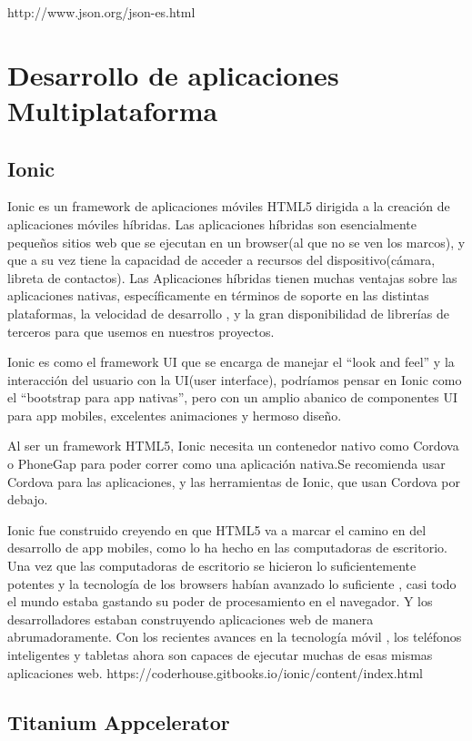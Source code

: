http://www.json.org/json-es.html


\section{Desarrollo de aplicaciones Multiplataforma}

\subsection{Ionic}
\setlength{\parskip}{5mm}
Ionic es un framework de aplicaciones móviles HTML5 dirigida a la creación de aplicaciones móviles híbridas. Las aplicaciones híbridas son esencialmente pequeños sitios web que se ejecutan en un browser(al que no se ven los marcos), y que a su vez tiene la capacidad de acceder a recursos del dispositivo(cámara, libreta de contactos). Las Aplicaciones híbridas tienen muchas ventajas sobre las aplicaciones nativas, específicamente en términos de soporte en las distintas plataformas, la velocidad de desarrollo , y la gran disponibilidad de librerías de terceros para que usemos en nuestros proyectos.

Ionic es como el framework UI que se encarga de manejar el “look and feel” y la interacción del usuario con la UI(user interface), podríamos pensar en Ionic como el “bootstrap para app nativas”, pero con un amplio abanico de componentes UI para app mobiles, excelentes animaciones y hermoso diseño.

Al ser un framework HTML5, Ionic necesita un contenedor nativo como Cordova o PhoneGap para poder correr como una aplicación nativa.Se recomienda usar Cordova para las aplicaciones, y las herramientas de Ionic, que usan Cordova por debajo.

Ionic fue construido creyendo en que HTML5 va a marcar el camino en del desarrollo de app mobiles, como lo ha hecho en las computadoras de escritorio. Una vez que las computadoras de escritorio se hicieron lo suficientemente potentes y la tecnología de los browsers habían avanzado lo suficiente , casi todo el mundo estaba gastando su poder de procesamiento en el navegador. Y los desarrolladores estaban construyendo aplicaciones web de manera abrumadoramente. Con los recientes avances en la tecnología móvil , los teléfonos inteligentes y tabletas ahora son capaces de ejecutar muchas de esas mismas aplicaciones web.
\setlength{\parskip}{0mm}
https://coderhouse.gitbooks.io/ionic/content/index.html

\subsection{Titanium Appcelerator}

